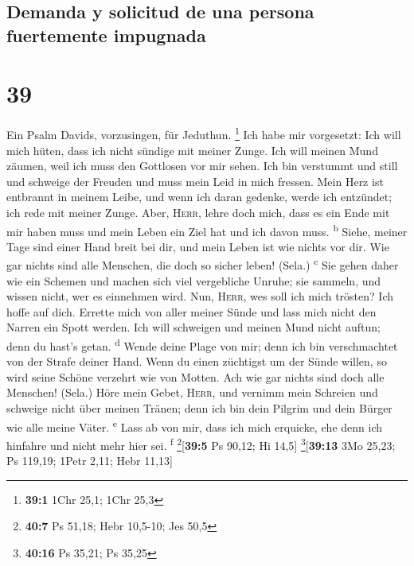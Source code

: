 \hypertarget{demanda-y-solicitud-de-una-persona-fuertemente-impugnada}{%
\subsection{Demanda y solicitud de una persona fuertemente
impugnada}\label{demanda-y-solicitud-de-una-persona-fuertemente-impugnada}}

\hypertarget{section-38}{%
\section{39}\label{section-38}}

 Ein Psalm Davids, vorzusingen, für Jeduthun. \footnote{\textbf{39:1}
  1Chr 25,1; 1Chr 25,3}  Ich habe mir vorgesetzt: Ich will
mich hüten, dass ich nicht sündige mit meiner Zunge. Ich will meinen
Mund zäumen, weil ich muss den Gottlosen vor mir sehen. 
Ich bin verstummt und still und schweige der Freuden und muss mein Leid
in mich fressen.  Mein Herz ist entbrannt in meinem Leibe,
und wenn ich daran gedenke, werde ich entzündet; ich rede mit meiner
Zunge.  Aber, \textsc{Herr}, lehre doch mich, dass es ein
Ende mit mir haben muss und mein Leben ein Ziel hat und ich davon muss.
\textsuperscript{b}  Siehe, meiner Tage sind einer Hand
breit bei dir, und mein Leben ist wie nichts vor dir. Wie gar nichts
sind alle Menschen, die doch so sicher leben! (Sela.)
\textsuperscript{c}  Sie gehen daher wie ein Schemen und
machen sich viel vergebliche Unruhe; sie sammeln, und wissen nicht, wer
es einnehmen wird.  Nun, \textsc{Herr}, wes soll ich mich
trösten? Ich hoffe auf dich.  Errette mich von aller
meiner Sünde und lass mich nicht den Narren ein Spott werden.
 Ich will schweigen und meinen Mund nicht auftun; denn du
hast's getan. \textsuperscript{d}  Wende deine Plage von
mir; denn ich bin verschmachtet von der Strafe deiner Hand.
 Wenn du einen züchtigst um der Sünde willen, so wird
seine Schöne verzehrt wie von Motten. Ach wie gar nichts sind doch alle
Menschen! (Sela.)  Höre mein Gebet, \textsc{Herr}, und
vernimm mein Schreien und schweige nicht über meinen Tränen; denn ich
bin dein Pilgrim und dein Bürger wie alle meine Väter.
\textsuperscript{e}  Lass ab von mir, dass ich mich
erquicke, ehe denn ich hinfahre und nicht mehr hier sei.
\textsuperscript{f} \footnote{\textbf{40:7} Ps 51,18; Hebr 10,5-10; Jes
  50,5}{[}\textbf{39:5} Ps 90,12; Hi 14,5{]}
\footnote{\textbf{40:16} Ps 35,21; Ps 35,25}{[}\textbf{39:13} 3Mo 25,23;
Ps 119,19; 1Petr 2,11; Hebr 11,13{]}

